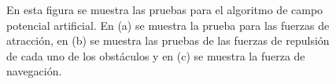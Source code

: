 \begin{figure}[ht!]
     \begin{center}
    \end{center}
  \captionsetup{font=footnotesize}
    \caption{\label{f:APF}En esta figura se muestra las pruebas para el algoritmo de campo potencial 
    artificial. En (a) se muestra la prueba para las fuerzas de atracción, en (b) se muestra las
    pruebas de las fuerzas de repulsión de cada uno de los obstáculos y en (c) se muestra la fuerza
    de navegación.}
\end{figure}

